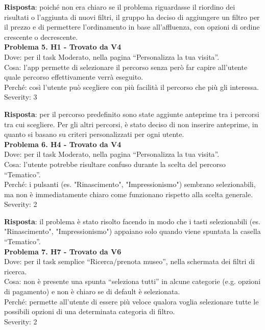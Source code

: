 \documentclass{article}
\begin{document}
\noindent \textbf{Risposta}: poiché non era chiaro se il problema riguardasse il riordino dei risultati o l’aggiunta di nuovi filtri, il gruppo ha deciso di aggiungere un filtro per il prezzo e di permettere l'ordinamento in base all’affluenza, con opzioni di ordine crescente o decrescente.\\

\noindent \textbf{Problema 5. H1 - Trovato da V4} \\
Dove: per il task Moderato, nella pagina “Personalizza la tua visita”. \\
Cosa: l'app permette di selezionare il percorso senza però far capire all’utente quale percorso effettivamente verrà eseguito. \\
Perché: così l’utente può scegliere con più facilità il percorso che più gli interessa. \\
Severity: 3

\noindent \textbf{Risposta}: per il percorso predefinito sono state aggiunte anteprime tra i percorsi tra cui scegliere. Per gli altri percorsi, è stato deciso di non inserire anteprime, in quanto si basano su criteri personalizzati per ogni utente.\\

\noindent \textbf{Problema 6. H4 - Trovato da V4} \\
Dove: per il task Moderato, nella pagina “Personalizza la tua visita”. \\
Cosa: l’utente potrebbe risultare confuso durante la scelta del percorso “Tematico”. \\
Perché: i pulsanti (es. "Rinascimento", "Impressionismo") sembrano selezionabili, ma non è immediatamente chiaro come funzionano rispetto alla scelta generale. \\
Severity: 2

\noindent \textbf{Risposta}: il problema è stato risolto facendo in modo che i tasti selezionabili (es. "Rinascimento", "Impressionismo") appaiano solo quando viene spuntata la casella “Tematico”.\\

\noindent \textbf{Problema 7. H7 - Trovato da V6} \\
Dove: per il task semplice “Ricerca/prenota museo”, nella schermata dei filtri di ricerca. \\
Cosa: non è presente una spunta “seleziona tutti” in alcune categorie (e.g. opzioni di pagamento) e non è chiaro se di default è selezionata. \\
Perché: permette all’utente di essere più veloce qualora voglia selezionare tutte le possibili opzioni di una determinata categoria di filtro. \\
Severity: 2
\end{document}
